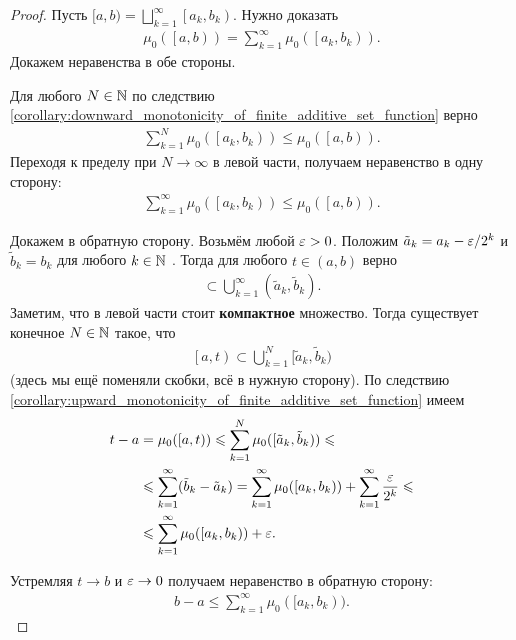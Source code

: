 \documentclass[../measure-theory.tex]{subfiles}
\begin{document}
\begin{proof}

 Пусть $[a, b) = \bigsqcup_{k=1}^{\infty} \left[a_k, b_k\right)$. Нужно доказать \begin{align*}
  \mu_0(\left[a, b\right)) = \sum_{k=1}^{\infty} \mu_0(\left[a_k, b_k\right))
 .\end{align*} Докажем неравенства в обе стороны.

 Для любого $N \in \mathbb{N}$ по следствию \ref{corollary:downward_monotonicity_of_finite_additive_set_function} верно
 \begin{align*}
  \sum_{k=1}^{N} \mu_0(\left[a_k, b_k\right)) \leqslant \mu_0(\left[a, b\right))
 .\end{align*}  Переходя к пределу при $N \to \infty$  в левой части, получаем неравенство в одну сторону:
 \begin{align*}
  \sum_{k=1}^{\infty} \mu_0(\left[a_k, b_k\right)) \leqslant \mu_0(\left[a, b\right))
 .\end{align*} 

 Докажем в обратную сторону. Возьмём любой $\varepsilon > 0$. Положим $\tilde a_k = a_k - \varepsilon / 2^{k}$  и $\tilde b_k = b_k$ для любого  $k \in \mathbb{N}$ . Тогда для любого $t \in (a, b)$  верно
 \begin{align*}
  [a,t] \subset \bigcup_{k=1}^{\infty} (\tilde a_k, \tilde b_k)
 .\end{align*} Заметим, что в левой части стоит \textbf{компактное} множество. Тогда существует конечное $N \in \mathbb{N}$  такое, что
 \begin{align*}
  \left[a, t\right) \subset \bigcup_{k=1}^{N} [\tilde a_k, \tilde b_k)
 \end{align*} (здесь мы ещё поменяли скобки, всё в нужную сторону). По следствию \ref{corollary:upward_monotonicity_of_finite_additive_set_function} имеем
 \begin{align*}
  t - a &= \mu_0([a, t)) \leqslant \sum_{k=1}^{N} \mu_0([\tilde a_k, \tilde b_k)) \leqslant \\
  &\leqslant \sum_{k=1}^{\infty} (\tilde b_k - \tilde a_k) = \sum_{k=1}^{\infty} \mu_0([a_k, b_k)) + \sum_{k=1}^{\infty} \frac{\varepsilon}{2^{k}} \leqslant \\
  &\leqslant \sum_{k=1}^{\infty} \mu_0([a_k, b_k)) + \varepsilon
 .\end{align*} 

 Устремляя $t \to b$  и $\varepsilon \to 0$  получаем неравенство в обратную сторону:
 \begin{align*}
  b - a \leqslant \sum_{k=1}^{\infty}  \mu_0([a_k, b_k))
 .\end{align*}
\end{proof}
\end{document}
